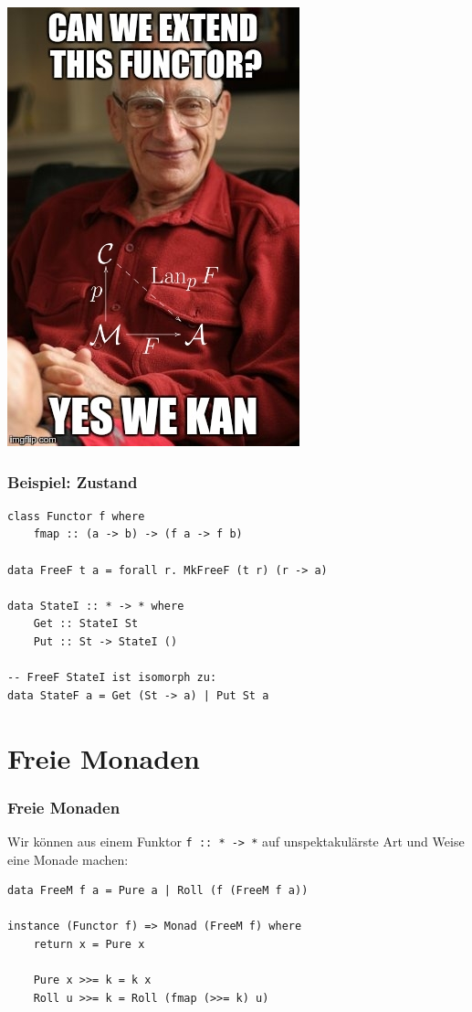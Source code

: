 \documentclass[12pt,compress,ngerman,utf8,t]{beamer}
\begin{document}
\begin{frame}[plain]
  \begin{center}
    \includegraphics[height=\textheight]{images/kan-extension}
  \end{center}
\end{frame}

\begin{frame}[fragile]\frametitle{Beispiel: Zustand}
  \begin{verbatim}
class Functor f where
    fmap :: (a -> b) -> (f a -> f b)

data FreeF t a = forall r. MkFreeF (t r) (r -> a)

data StateI :: * -> * where
    Get :: StateI St
    Put :: St -> StateI ()

-- FreeF StateI ist isomorph zu:
data StateF a = Get (St -> a) | Put St a
  \end{verbatim}
\end{frame}


\section{Freie Monaden}
\begin{frame}[fragile]\frametitle{Freie Monaden}
  Wir können aus einem Funktor \texttt{f :: * -> *} auf unspektakulärste
  Art und Weise eine Monade machen:
  \begin{verbatim}
data FreeM f a = Pure a | Roll (f (FreeM f a))

instance (Functor f) => Monad (FreeM f) where
    return x = Pure x

    Pure x >>= k = k x
    Roll u >>= k = Roll (fmap (>>= k) u)
  \end{verbatim}
\end{frame}
\end{document}
